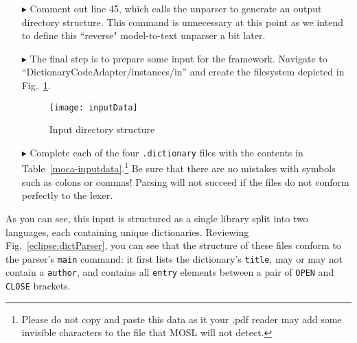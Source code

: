 \begin{itemize}

\item[$\blacktriangleright$] Comment out line 45, which calls the unparser to generate an output directory structure. This command is unnecessary at this point
as we intend to define this ``reverse" model-to-text unparser a bit later. 

\newpage

\item[$\blacktriangleright$] The final step is to prepare some input for the framework. Navigate to ``DictionaryCodeAdapter/instances/in'' and create the
filesystem depicted in Fig.~\ref{eclipse:textDirectory}. 

\vspace{1cm}

\begin{figure}[htp]
\begin{center}
  \texttt{[image: inputData]}
  \caption{Input directory structure}
  \label{eclipse:textDirectory}
\end{center}
\end{figure}

\vspace{1cm}

\item[$\blacktriangleright$] Complete each of the four \texttt{.dictionary} files with the contents in Table~\ref{moca-inputdata}.\footnote{Please do not
copy and paste this data as it your .pdf reader may add some invisible characters to the file that MOSL will not detect.} Be sure that there are no mistakes
with symbols such as colons or commas! Parsing will not succeed if the files do not conform perfectly to the lexer. 

\end{itemize}

As you can see, this input is structured as a single library split into two languages, each containing unique dictionaries. Reviewing
Fig.~\ref{eclipse:dictParser}, you can see that the structure of these files conform to the parser's \texttt{main} command: it first lists the dictionary's
\texttt{title}, may or may not contain a \texttt{author}, and contains all \texttt{entry} elements between a pair of \texttt{OPEN} and \texttt{CLOSE} brackets.

